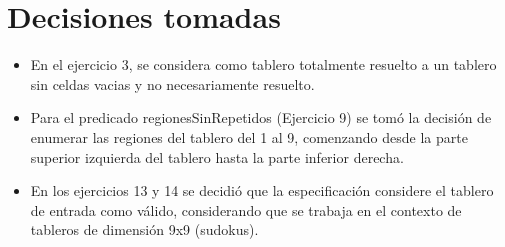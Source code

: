 \documentclass[a4paper]{article}
\begin{document}
\section{Decisiones tomadas}

    \begin{itemize}
        \item En el ejercicio 3, se considera como tablero totalmente resuelto a un tablero sin celdas vacias y no necesariamente resuelto.
        \item Para el predicado {\normalfont\ttfamily regionesSinRepetidos} (Ejercicio 9) se tomó la decisión de enumerar las regiones del tablero del 1 al 9, comenzando desde la parte superior izquierda del tablero hasta la parte inferior derecha.   
        \item En los ejercicios 13 y 14 se decidió que la especificación considere el tablero de entrada como válido, considerando que se trabaja en el contexto de tableros de dimensión 9x9 (sudokus).  
    \end{itemize}
    
\end{document}
